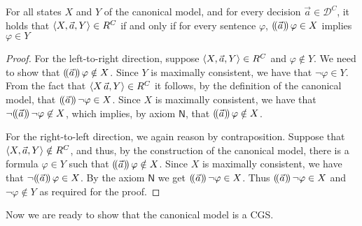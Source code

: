 \documentclass[sigconf,anonymous]{aamas}
\begin{document}
\begin{proposition}\label{prop:existforall}
    For all states $X$ and $Y$ of the canonical model, and for every decision $\vec{a} \in \mathcal{D}^C$, it holds that $\langle X,\vec{a},Y \rangle\in R^C$ if and only if for every sentence $\varphi$, $(\!( \vec{a} )\!)\,\varphi\in X $ implies $\varphi\in Y$
\end{proposition}
\begin{proof}
    For the left-to-right direction, suppose $\langle X,\vec{a},Y \rangle\in R^C$  and $\varphi\not\in Y$. We need to show that $(\!( \vec{a} )\!)\,\varphi\notin X$. Since $Y$ is maximally consistent, we have that $\neg\varphi\in Y$. From the fact that $\langle X\,\vec{a},Y \rangle \in R^C$ it follows, by the definition of the canonical model, that $(\!( \vec a )\!)\,\neg \varphi\in X$. Since $X$ is maximally consistent, we have that $\neg(\!( \vec a )\!)\, \neg \varphi \not\in  X$, which implies, by axiom $\mathsf{N}$, that $(\!( \vec{a} )\!)\,\varphi\notin X$. 
    
    For the right-to-left direction, we again reason by contraposition. Suppose that $\langle X,\vec{a},Y \rangle\notin R^C$, and thus, by the construction of the canonical model, there is a formula $\varphi \in Y$ such that $(\!( \vec a )\!)\,\varphi\notin X$. Since $X$ is maximally consistent,  we have that $\neg(\!( \vec a )\!)\,\varphi\in X$. By the axiom $\mathsf{N}$ we get $(\!( \vec{a} )\!)\,\neg \varphi \in X$. Thus $(\!( \vec{a} )\!)\,\neg \varphi \in X$ and $\neg\varphi \not\in Y$ as required for the proof. 
\end{proof}

Now we are ready to show that the canonical model is a CGS.
\end{document}
